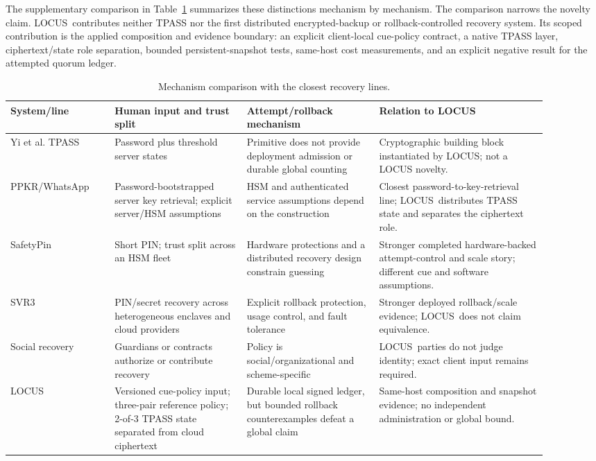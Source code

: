 \documentclass[sigconf,anonymous]{acmart}
\newcommand{\LOCUS}{\textsf{LOCUS}}
\begin{document}
The supplementary comparison in Table~\ref{tab:recovery-comparison} summarizes
these distinctions mechanism by mechanism. The comparison narrows the novelty
claim. \LOCUS\ contributes neither TPASS nor
the first distributed encrypted-backup or rollback-controlled recovery system.
Its scoped contribution is the applied composition and evidence boundary:
an explicit client-local cue-policy contract, a native TPASS layer, ciphertext/state role
separation, bounded persistent-snapshot tests, same-host cost
measurements, and an explicit negative result for the attempted quorum ledger.

\begin{table}[!t]
\centering
\caption{Mechanism comparison with the closest recovery lines.}
\label{tab:recovery-comparison}
\footnotesize
\begin{tabular}{p{0.17\linewidth}p{0.22\linewidth}p{0.22\linewidth}p{0.29\linewidth}}
\toprule
\textbf{System/line} & \textbf{Human input and trust split} & \textbf{Attempt/rollback mechanism} & \textbf{Relation to \LOCUS} \\
\midrule
Yi et al. TPASS~\cite{Yi2019TPASS} & Password plus threshold server states & Primitive does not provide deployment admission or durable global counting & Cryptographic building block instantiated by \LOCUS; not a LOCUS novelty. \\
\addlinespace
PPKR/WhatsApp~\cite{WhatsAppBackup2023,PPKR2024} & Password-bootstrapped server key retrieval; explicit server/HSM assumptions & HSM and authenticated service assumptions depend on the construction & Closest password-to-key-retrieval line; \LOCUS\ distributes TPASS state and separates the ciphertext role. \\
\addlinespace
SafetyPin~\cite{SafetyPin2020} & Short PIN; trust split across an HSM fleet & Hardware protections and a distributed recovery design constrain guessing & Stronger completed hardware-backed attempt-control and scale story; different cue and software assumptions. \\
\addlinespace
SVR3~\cite{SVR3_2024} & PIN/secret recovery across heterogeneous enclaves and cloud providers & Explicit rollback protection, usage control, and fault tolerance & Stronger deployed rollback/scale evidence; \LOCUS\ does not claim equivalence. \\
\addlinespace
Social recovery & Guardians or contracts authorize or contribute recovery & Policy is social/organizational and scheme-specific & \LOCUS\ parties do not judge identity; exact client input remains required. \\
\addlinespace
\LOCUS & Versioned cue-policy input; three-pair reference policy; 2-of-3 TPASS state separated from cloud ciphertext & Durable local signed ledger, but bounded rollback counterexamples defeat a global claim & Same-host composition and snapshot evidence; no independent administration or global bound. \\
\bottomrule
\end{tabular}
\end{table}
\end{document}
